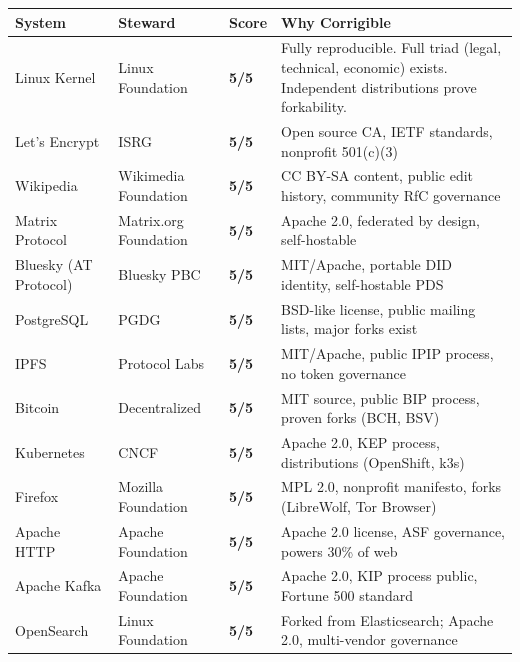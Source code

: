 \begin{table}[htbp]
\centering
\small
\renewcommand{\arraystretch}{1.3}
\begin{tabular}{@{}l>{\raggedright}p{3.2cm}>{\centering\arraybackslash}p{1.2cm}p{5.8cm}@{}}
\toprule
\rowcolor{gray!15}
\textbf{System} & \textbf{Steward} & \textbf{Score} & \textbf{Why Corrigible} \\
\midrule
\rowcolor{green!8}
Linux Kernel & Linux Foundation & \cellcolor{green!25}\textbf{5/5} & Fully reproducible. Full triad (legal, technical, economic) exists. Independent distributions prove forkability. \\
Let's Encrypt & ISRG & \cellcolor{green!25}\textbf{5/5} & Open source CA, IETF standards, nonprofit 501(c)(3) \\
\rowcolor{green!8}
Wikipedia & Wikimedia Foundation & \cellcolor{green!25}\textbf{5/5} & CC BY-SA content, public edit history, community RfC governance \\
Matrix Protocol & Matrix.org Foundation & \cellcolor{green!25}\textbf{5/5} & Apache 2.0, federated by design, self-hostable \\
\rowcolor{green!8}
Bluesky (AT Protocol) & Bluesky PBC & \cellcolor{green!25}\textbf{5/5} & MIT/Apache, portable DID identity, self-hostable PDS \\
PostgreSQL & PGDG & \cellcolor{green!25}\textbf{5/5} & BSD-like license, public mailing lists, major forks exist \\
\rowcolor{green!8}
IPFS & Protocol Labs & \cellcolor{green!25}\textbf{5/5} & MIT/Apache, public IPIP process, no token governance \\
Bitcoin & Decentralized & \cellcolor{green!25}\textbf{5/5} & MIT source, public BIP process, proven forks (BCH, BSV) \\
\rowcolor{green!8}
Kubernetes & CNCF & \cellcolor{green!25}\textbf{5/5} & Apache 2.0, KEP process, distributions (OpenShift, k3s) \\
Firefox & Mozilla Foundation & \cellcolor{green!25}\textbf{5/5} & MPL 2.0, nonprofit manifesto, forks (LibreWolf, Tor Browser) \\
\rowcolor{green!8}
Apache HTTP & Apache Foundation & \cellcolor{green!25}\textbf{5/5} & Apache 2.0 license, ASF governance, powers 30\% of web \\
Apache Kafka & Apache Foundation & \cellcolor{green!25}\textbf{5/5} & Apache 2.0, KIP process public, Fortune 500 standard \\
\rowcolor{green!8}
OpenSearch & Linux Foundation & \cellcolor{green!25}\textbf{5/5} & Forked from Elasticsearch; Apache 2.0, multi-vendor governance \\

\end{tabular}
\end{table}
